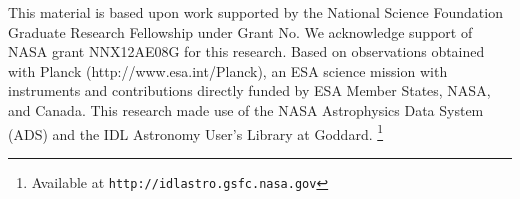 \documentclass{emulateapj}
\begin{document}


This material is based upon work supported by the National Science Foundation 
Graduate Research Fellowship under Grant No. We acknowledge support of NASA 
grant NNX12AE08G for this research. Based on observations obtained with Planck 
(http://www.esa.int/Planck), an ESA science mission with instruments and 
contributions directly funded by ESA Member States, NASA, and Canada. This 
research made use of the NASA Astrophysics Data System (ADS) and the IDL 
Astronomy User's Library at Goddard. \footnote{Available at 
\texttt{http://idlastro.gsfc.nasa.gov}}



\end{document}
